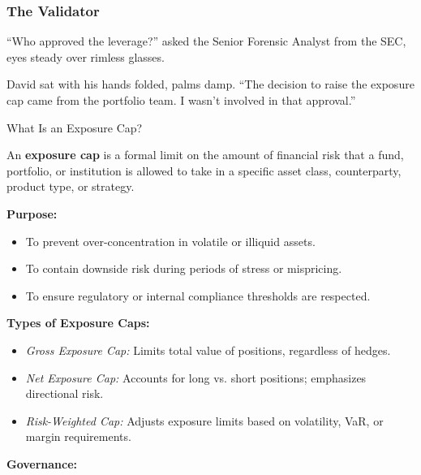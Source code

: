 \medskip

\subsubsection{The Validator}

``Who approved the leverage?'' asked the Senior Forensic Analyst from the SEC, eyes steady over rimless glasses.

David sat with his hands folded, palms damp. ``The decision to raise the exposure cap came from the portfolio team. 
I wasn’t involved in that approval.''

\medskip

\begin{TechnicalSidebar}{What Is an Exposure Cap?}

  An \textbf{exposure cap} is a formal limit on the amount of financial risk that a fund, portfolio, or 
  institution is allowed to take in a specific asset class, counterparty, product type, or strategy.

  \medskip
  
  \textbf{Purpose:}

  \medskip

  \begin{itemize}
    \item To prevent over-concentration in volatile or illiquid assets.
    \item To contain downside risk during periods of stress or mispricing.
    \item To ensure regulatory or internal compliance thresholds are respected.
  \end{itemize}
  
  \medskip

  \textbf{Types of Exposure Caps:}

  \medskip

  \begin{itemize}
    \item \textit{Gross Exposure Cap:} Limits total value of positions, regardless of hedges.
    \item \textit{Net Exposure Cap:} Accounts for long vs. short positions; emphasizes directional risk.
    \item \textit{Risk-Weighted Cap:} Adjusts exposure limits based on volatility, VaR, or margin 
    requirements.
  \end{itemize}
  
  \medskip

  \textbf{Governance:}


\end{TechnicalSidebar}
